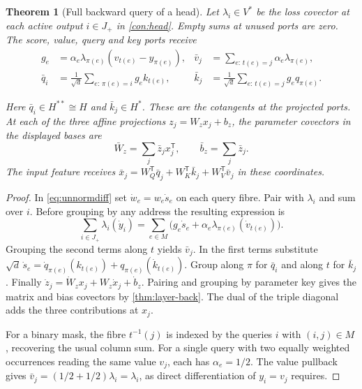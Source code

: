 \documentclass[11pt,a4paper]{article}
\newtheorem{theorem}{Theorem}[section]
\theoremstyle{definition}
\theoremstyle{remark}\newaliascnt{remark}{theorem}
\numberwithin{equation}{section}
\begin{document}
\begin{theorem}[Full backward query of a head]\label{thm:head-back}
Let $\lambda_i\in V^*$ be the loss covector at each active output $i\in J_+$ in \cref{con:head}. Empty sums at unused ports are zero. The score, value, query and key ports receive
\begin{align}
 g_e&=\alpha_e\lambda_{\pi(e)}(v_{t(e)}-y_{\pi(e)}),&
 \bar v_j&=\sum_{e:\,t(e)=j}\alpha_e\lambda_{\pi(e)},\\
 \bar q_i&=\frac{1}{\sqrt d}\sum_{e:\,\pi(e)=i}g_e k_{t(e)},&
 \bar k_j&=\frac{1}{\sqrt d}\sum_{e:\,t(e)=j}g_e q_{\pi(e)} .
\end{align}

Here \(\bar q_i\in H^{**}\cong H\) and \(\bar k_j\in H^*\). These are the cotangents at the projected ports. At each of the three affine projections \(z_j=W_z x_j+b_z\), the parameter covectors in the displayed bases are
\[
 \bar W_z=\sum_j\bar z_j x_j^{\mathsf T},\qquad \bar b_z=\sum_j\bar z_j .
\]
The input feature receives \(\bar x_j=W_Q^{\mathsf T}\bar q_j+W_K^{\mathsf T}\bar k_j+W_V^{\mathsf T}\bar v_j\) in these coordinates.
\end{theorem}
\begin{proof}
In \cref{eq:unnormdiff} set $\dot w_e=w_e\dot s_e$ on each query fibre. Pair with $\lambda_i$ and sum over $i$. Before grouping by any address the resulting expression is
\[
 \sum_{i\in J_+}\lambda_i(\dot y_i)=
 \sum_{e\in M}\bigl(g_e\dot s_e+
               \alpha_e\lambda_{\pi(e)}(\dot v_{t(e)})\bigr).
\]
Grouping the second terms along $t$ yields $\bar v_j$. In the first terms substitute
$\sqrt d\,\dot s_e=\dot q_{\pi(e)}(k_{t(e)})+
q_{\pi(e)}(\dot k_{t(e)})$. Group along $\pi$ for $\bar q_i$ and along $t$ for $\bar k_j$. Finally $\dot z_j=\dot W_z x_j+W_z\dot x_j+\dot b_z$. Pairing and grouping by parameter key gives the matrix and bias covectors by \cref{thm:layer-back}. The dual of the triple diagonal adds the three contributions at $x_j$.

For a binary mask, the fibre $t^{-1}(j)$ is indexed by the queries $i$ with $(i,j)\in M$, recovering the usual column sum. For a single query with two equally weighted occurrences reading the same value $v_j$, each has $\alpha_e=1/2$. The value pullback gives $\bar v_j=(1/2+1/2)\lambda_i=\lambda_i$, as direct differentiation of $y_i=v_j$ requires.
\end{proof}
\end{document}
